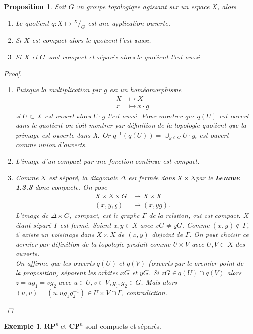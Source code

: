 \documentclass[12pt]{book}
\newtheorem{prop}[lemma]{Proposition}
\theoremstyle{definition}
\newtheorem{example}[lemma]{Exemple}
\theoremstyle{remark}
\newcommand*\quot[2]{{^{\textstyle #1}\big/_{\textstyle #2}}}
\begin{document}
	\begin{prop}
		Soit $G$ un groupe topologique agissant sur un espace $X$, alors
		\begin{enumerate}
			\item Le quotient $q : X \longmapsto \quot{X}{G}$ est une application ouverte.
			\item Si $X$ est compact alors le quotient l'est aussi.
			\item Si $X$ et $G$ sont compact et séparés alors le quotient l'est aussi.
		\end{enumerate}
		\begin{proof}
			\begin{enumerate}
				\item Puisque la multiplication par $g$ est un homéomorphisme 
					 \begin{align*}
						 X &\longmapsto X \\
						 x &\longmapsto x\cdot g
					\end{align*}
					si $U \subset X$ est ouvert alors $U \cdot g$ l'est aussi. Pour montrer que $q(U)$ est ouvert dans le quotient on doit montrer par définition de la topologie quotient que la primage est ouverte dans X. Or  $q^{-1}(q(U)) = \cup_{g\in G}U\cdot g$, est ouvert comme union d'ouverts.
				\item L'image d'un compact par une fonction continue est compact.
				\item Comme $X$ est séparé, la diagonale $\Delta$ est fermée dans $X \times X$par le \textbf{Lemme 1.3.3} donc compacte. On pose
					\begin{align*}
						X \times X \times G &\longmapsto X \times X \\
						(x,y,g) &\longmapsto (x,yg)
					.\end{align*}
					L'image de $\Delta \times G$, compact, est le graphe $\Gamma$ de la relation, qui est compact. X étant séparé $\Gamma$ est fermé. Soient  $x,y \in X$ avec $xG \neq yG$. Comme  $(x,y) \not\in \Gamma$, il existe un voisinage dans $X\times X$ de $(x,y)$ disjoint de  $\Gamma$. On peut choisir ce dernier par définition de la topologie produit comme $U\times V$ avec $U,V \subset X$ des ouverts.  \\
					On affirme que les ouverts $q(U)$ et  $q(V)$ (ouverts par le premier point de la proposition) séparent les orbites  $xG$ et $yG$. Si  $zG \in q(U)\cap q(V)$ alors $z = ug_1 = vg_2$ avec $u\in U,v \in V, g_1,g_2\in G$. Mais alors $(u,v) = (u,ug_1g^{-1}_2) \in U\times V \cap \Gamma$, contradiction.
			\end{enumerate}
		\end{proof}
	\end{prop}
	\begin{example}
		$\mathbf{RP}^n$ et $\mathbf{CP}^n$ sont compacts et séparés.
	\end{example}
\end{document}
